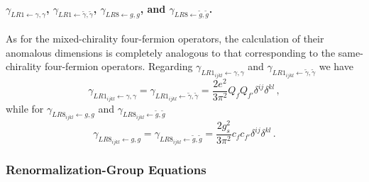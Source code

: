 \paragraph{\texorpdfstring{$\gamma_{LR1 \leftarrow \gamma,\gamma}$, $\gamma_{LR1 \leftarrow \tilde \gamma,\tilde \gamma}$, $\gamma_{LR8\leftarrow g,g}$, and $\gamma_{LR8\leftarrow \tilde g, \tilde g}$}{gamma LR1 and LR8}.}
As for the mixed-chirality four-fermion operators, the calculation of their anomalous
dimensions is completely analogous to that corresponding to the same-chirality four-fermion
operators.
Regarding $\gamma_{LR1_{ijkl} \leftarrow \gamma,\gamma}$ and
$\gamma_{LR1_{ijkl} \leftarrow \tilde \gamma,\tilde \gamma}$ we have
\begin{equation}
    \gamma_{LR1_{ijkl} \leftarrow \gamma,\gamma} = \gamma_{LR1_{ijkl} \leftarrow \tilde \gamma,\tilde \gamma} = \frac{2e^2}{3\pi^2}Q_f Q_{f'} \delta^{ij} \delta^{kl}\,,
\end{equation}
while for $\gamma_{LR8_{ijkl}\leftarrow g,g}$ and
$\gamma_{LR8_{ijkl} \leftarrow \tilde g, \tilde g}$
\begin{equation}
    \gamma_{LR8_{ijkl}\leftarrow g,g} = \gamma_{LR8_{ijkl} \leftarrow \tilde g, \tilde g} = \frac{2g_s^2}{3\pi^2}c_f c_{f'} \delta^{ij} \delta^{kl}\,.
\end{equation}

\subsubsection{Renormalization-Group Equations}
\label{sec:ALPRGELEFT}

